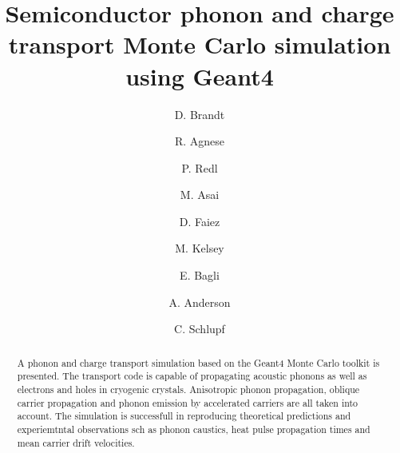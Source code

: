\documentclass[preprint,12pt]{elsarticle}
\begin{document}
\begin{frontmatter}


\author{D. Brandt }
\author{R. Agnese }
\author{P. Redl }
\author{M. Asai }
\author{D. Faiez }
\author{M. Kelsey }
\author{E. Bagli }
\author{A. Anderson }
\author{C. Schlupf }



\title{Semiconductor phonon and charge transport Monte Carlo simulation using Geant4}


\author{}

\address{}

\begin{abstract}

A phonon and charge transport simulation based on the Geant4 Monte Carlo toolkit is presented. The transport code is capable of propagating acoustic phonons as well as electrons and holes in cryogenic crystals. Anisotropic phonon propagation, oblique carrier propagation and phonon emission by accelerated carriers are all taken into account. The simulation is successfull in reproducing theoretical predictions and experiemtntal observations sch as phonon caustics, heat pulse propagation times and mean carrier drift velocities.


\end{abstract}
\end{frontmatter}
\end{document}
